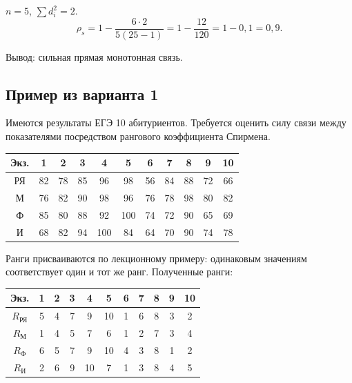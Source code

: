 $n=5$, $\sum d_i^2 = 2$.
\[
  \rho_s = 1 - \frac{6 \cdot 2}{5(25 - 1)} = 1 - \frac{12}{120} = 1 - 0{,}1 = 0{,}9.
\]

Вывод: сильная прямая монотонная связь.

\subsection*{Пример из варианта 1}

Имеются результаты ЕГЭ 10 абитуриентов. Требуется оценить силу связи между показателями посредством рангового коэффициента Спирмена.

\begin{center}
\small
\begin{tabular}{c|cccccccccc}
  \hline
  Экз. & 1 & 2 & 3 & 4 & 5 & 6 & 7 & 8 & 9 & 10 \\
  \hline
  РЯ & 82 & 78 & 85 & 96 & 98 & 56 & 84 & 88 & 72 & 66 \\
  М  & 76 & 82 & 90 & 98 & 96 & 76 & 78 & 98 & 80 & 82 \\
  Ф  & 85 & 80 & 88 & 92 & 100 & 74 & 72 & 90 & 65 & 69 \\
  И  & 68 & 82 & 94 & 100 & 84 & 64 & 70 & 90 & 74 & 78 \\
  \hline
\end{tabular}
\end{center}

Ранги присваиваются по лекционному примеру: одинаковым значениям соответствует один и тот же ранг. Полученные ранги:
\begin{center}
\small
\begin{tabular}{c|cccccccccc}
  \hline
  Экз. & 1 & 2 & 3 & 4 & 5 & 6 & 7 & 8 & 9 & 10 \\
  \hline
  $R_{\text{РЯ}}$ & 5 & 4 & 7 & 9 & 10 & 1 & 6 & 8 & 3 & 2 \\
  $R_{\text{М}}$  & 1 & 4 & 5 & 7 & 6 & 1 & 2 & 7 & 3 & 4 \\
  $R_{\text{Ф}}$  & 6 & 5 & 7 & 9 & 10 & 4 & 3 & 8 & 1 & 2 \\
  $R_{\text{И}}$  & 2 & 6 & 9 & 10 & 7 & 1 & 3 & 8 & 4 & 5 \\
  \hline
\end{tabular}
\end{center}

